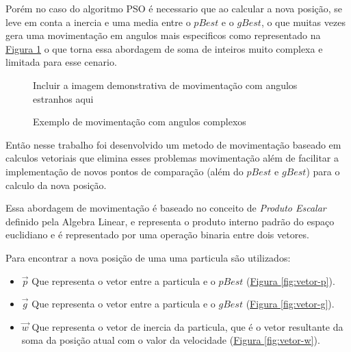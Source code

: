             Porém no caso do algoritmo PSO é necessario que ao calcular a nova posição, se leve em conta a inercia e uma media entre o $pBest$ e o $gBest$, o que muitas vezes gera uma movimentação em angulos mais especificos como representado na 
            \hyperref[fig:angular-moviment-grid-based]{Figura \ref{fig:angular-moviment-grid-based}}
            o que torna essa abordagem de soma de inteiros muito complexa e limitada para esse cenario.\newline
            
            \begin{figure}[h]
                \centering
                \small{Incluir a imagem demonstrativa de movimentação com angulos estranhos aqui}
                \caption{Exemplo de movimentação com angulos complexos}
                \label{fig:angular-moviment-grid-based}
            \end{figure}
            
            
            Então nesse trabalho foi desenvolvido um metodo de movimentação baseado em calculos vetoriais que elimina esses problemas movimentação além de facilitar a implementação de novos pontos de comparação (além do $pBest$ e $gBest$) para o calculo da nova posição.\newline
            
                Essa abordagem de movimentação é baseado no conceito de \textit{Produto Escalar} definido pela Algebra Linear, e representa o produto interno padrão do espaço euclidiano e é representado por uma operação binaria entre dois vetores.\newline
                
                \noindent Para encontrar a nova posição de uma uma particula são utilizados:
                \begin{itemize}
                    \item $\vec p$ Que representa o vetor entre a particula e o $pBest$ 
                        (\hyperref[fig:vetor-p]{Figura \ref{fig:vetor-p}}).
                    \item $\vec g$ Que representa o vetor entre a particula e o $gBest$ 
                        (\hyperref[fig:vetor-g]{Figura \ref{fig:vetor-g}}).
                    \item $\vec w$ Que representa o vetor de inercia da particula, que é o vetor resultante da soma da posição atual com o valor da velocidade 
                        (\hyperref[fig:vetor-w]{Figura \ref{fig:vetor-w}}).
                \end{itemize}


